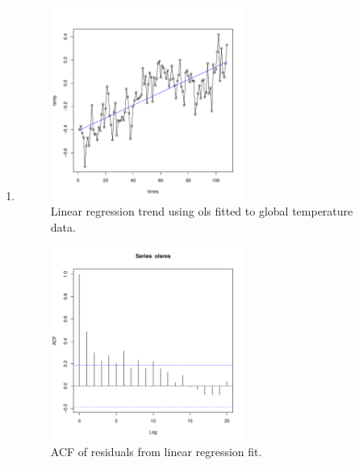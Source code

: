 \documentclass[12pt]{article}
\newenvironment{solution}[2][Solution]{\begin{trivlist}
	\item[\hskip \labelsep {\bfseries #1}]}{\end{trivlist}}
\begin{document}
	\begin{solution}{}
	$ $
	\begin{enumerate}[label=(\alph*)]
		\item 
		
		\begin{figure}[H]
    			\centering
    			\includegraphics[width=0.6\textwidth]{figs/problem_7/temp_ols.pdf}
    			\caption{Linear regression trend using ols fitted to global temperature data.}
    			\label{fig:monthly_model}
		\end{figure}
		
		\begin{figure}[H]
    			\centering
    			\includegraphics[width=0.6\textwidth]{figs/problem_7/temp_acf.pdf}
    			\caption{ACF of residuals from linear regression fit.}
    			\label{fig:monthly_model}
		\end{figure}


\end{enumerate}
\end{solution}
\end{document}
